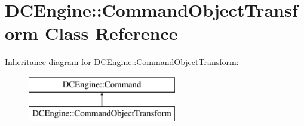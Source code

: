 \hypertarget{classDCEngine_1_1CommandObjectTransform}{\section{D\-C\-Engine\-:\-:Command\-Object\-Transform Class Reference}
\label{classDCEngine_1_1CommandObjectTransform}
}
Inheritance diagram for D\-C\-Engine\-:\-:Command\-Object\-Transform\-:\begin{figure}[H]
\begin{center}
\leavevmode
\includegraphics[height=2.000000cm]{classDCEngine_1_1CommandObjectTransform}
\end{center}
\end{figure}
